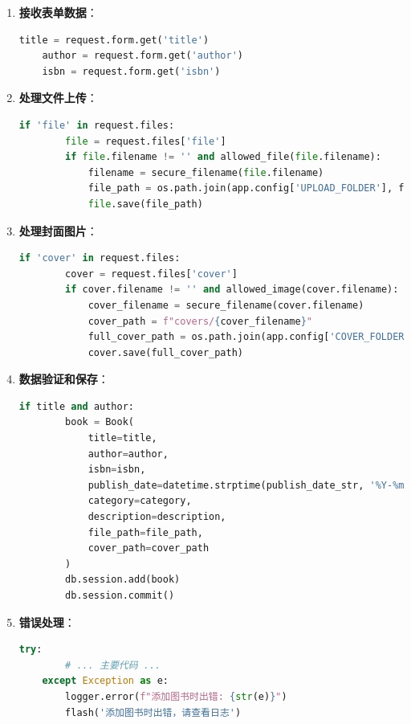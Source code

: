 \documentclass{SYSUReport}
\begin{document}
\begin{enumerate}
    \item \textbf{接收表单数据}：
    \begin{lstlisting}[language=Python]
    title = request.form.get('title')
    author = request.form.get('author')
    isbn = request.form.get('isbn')
    \end{lstlisting}
    
    \item \textbf{处理文件上传}：
    \begin{lstlisting}[language=Python]
    if 'file' in request.files:
        file = request.files['file']
        if file.filename != '' and allowed_file(file.filename):
            filename = secure_filename(file.filename)
            file_path = os.path.join(app.config['UPLOAD_FOLDER'], filename)
            file.save(file_path)
    \end{lstlisting}
    
    \item \textbf{处理封面图片}：
    \begin{lstlisting}[language=Python]
    if 'cover' in request.files:
        cover = request.files['cover']
        if cover.filename != '' and allowed_image(cover.filename):
            cover_filename = secure_filename(cover.filename)
            cover_path = f"covers/{cover_filename}"
            full_cover_path = os.path.join(app.config['COVER_FOLDER'], cover_filename)
            cover.save(full_cover_path)
    \end{lstlisting}
    
    \item \textbf{数据验证和保存}：
    \begin{lstlisting}[language=Python]
    if title and author:
        book = Book(
            title=title,
            author=author,
            isbn=isbn,
            publish_date=datetime.strptime(publish_date_str, '%Y-%m-%d').date() if publish_date_str else None,
            category=category,
            description=description,
            file_path=file_path,
            cover_path=cover_path
        )
        db.session.add(book)
        db.session.commit()
    \end{lstlisting}
    
    \item \textbf{错误处理}：
    \begin{lstlisting}[language=Python]
    try:
        # ... 主要代码 ...
    except Exception as e:
        logger.error(f"添加图书时出错: {str(e)}")
        flash('添加图书时出错，请查看日志')
    \end{lstlisting}
\end{enumerate}
\end{document}
